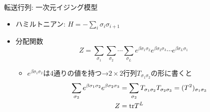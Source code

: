 \begin{frame}[t,fragile]{転送行列: 一次元イジング模型}
  \begin{itemize}
    \setlength{\itemsep}{1em}
  \item ハミルトニアン: $H = - \sum_i \sigma_i \sigma_{i+1}$
  \item 分配関数
    \[
    Z = \sum_{\sigma_1}\sum_{\sigma_2}\cdots\sum_{\sigma_L} e^{\beta \sigma_1 \sigma_2} e^{\beta \sigma_2 \sigma_3} \cdots e^{\beta \sigma_L \sigma_1}
    \]
    \begin{itemize}
    \item $e^{\beta \sigma_1 \sigma_2}$は4通りの値を持つ→$2\times2$行列$T_{\sigma_1 \sigma_2}$の形に書くと
      \begin{align*}
      \sum_{\sigma_2} e^{\beta \sigma_1 \sigma_2} e^{\beta \sigma_2 \sigma_3} &= \sum_{\sigma_2} T_{\sigma_1 \sigma_2} T_{\sigma_2 \sigma_3} = (T^2)_{\sigma_1 \sigma_3} \\
      Z &= {\rm tr} T^L
      \end{align*}
    \end{itemize}
  \end{itemize}
\end{frame}
